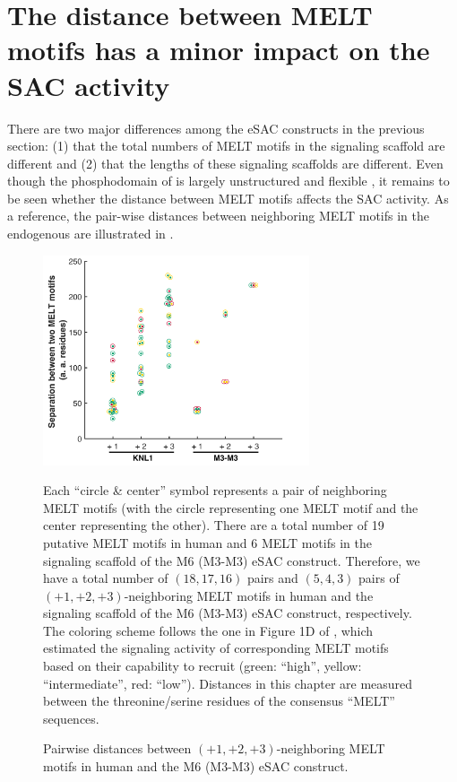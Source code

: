 \section{The distance between MELT motifs has a minor impact on the SAC activity}

There are two major differences among the eSAC constructs in the previous section: (1) that the total numbers of MELT motifs in the signaling scaffold are different and (2) that the lengths of these signaling scaffolds are different. Even though the phosphodomain of  is largely unstructured and flexible \cite{UnstructuredKNL1}, it remains to be seen whether the distance between MELT motifs affects the SAC activity. As a reference, the pair-wise distances between neighboring MELT motifs in the endogenous  are illustrated in .

\begin{figure}
    \centering
    \includegraphics[width=0.7\textwidth]{chapters/figures/MELTSeparationColorCodedBeeSwarmPlot.pdf}
    \caption{Pairwise distances between $(+1, +2, +3)$-neighboring MELT motifs in human  and the M6 (M3-M3) eSAC construct.}
    \noindent\justifying Each ``circle \& center'' symbol represents a pair of neighboring MELT motifs (with the circle representing one MELT motif and the center representing the other). There are a total number of 19 putative MELT motifs in human  and 6 MELT motifs in the signaling scaffold of the M6 (M3-M3) eSAC construct. Therefore, we have a total number of $(18, 17, 16)$ pairs and $(5, 4, 3)$ pairs of $(+1, +2, +3)$-neighboring MELT motifs in human  and the signaling scaffold of the M6 (M3-M3) eSAC construct, respectively. The coloring scheme follows the one in Figure 1D of \cite{MELTActivity}, which estimated the signaling activity of corresponding MELT motifs based on their capability to recruit  (green: ``high'', yellow: ``intermediate'', red: ``low''). Distances in this chapter are measured between the threonine/serine residues of the consensus ``MELT'' sequences.
    \label{PairwiseDistancesBetweenNeighboringMELTs}
\end{figure}

